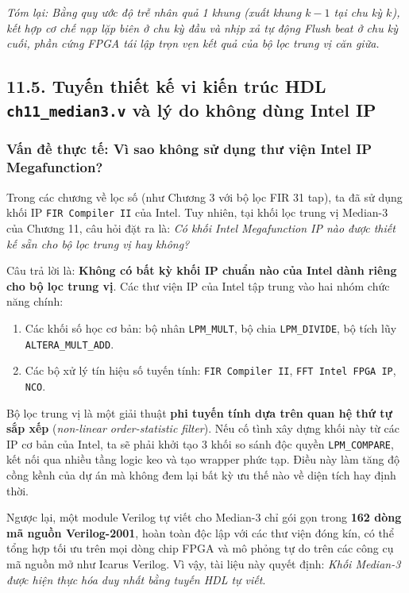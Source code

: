 \textit{Tóm lại: Bằng quy ước độ trễ nhân quả 1 khung (xuất khung $k-1$ tại chu kỳ $k$), kết hợp cơ chế nạp lặp biên ở chu kỳ đầu và nhịp xả tự động Flush beat ở chu kỳ cuối, phần cứng FPGA tái lập trọn vẹn kết quả của bộ lọc trung vị căn giữa.}

\subsection*{11.5. Tuyến thiết kế vi kiến trúc HDL \texttt{ch11\_median3.v} và lý do không dùng Intel IP}

\subsubsection*{Vấn đề thực tế: Vì sao không sử dụng thư viện Intel IP Megafunction?}
Trong các chương về lọc số (như Chương 3 với bộ lọc FIR 31 tap), ta đã sử dụng khối IP \texttt{FIR Compiler II} của Intel. Tuy nhiên, tại khối lọc trung vị Median-3 của Chương 11, câu hỏi đặt ra là: \emph{Có khối Intel Megafunction IP nào được thiết kế sẵn cho bộ lọc trung vị hay không?}

Câu trả lời là: \textbf{Không có bất kỳ khối IP chuẩn nào của Intel dành riêng cho bộ lọc trung vị}.
Các thư viện IP của Intel tập trung vào hai nhóm chức năng chính:
\begin{enumerate}
    \item Các khối số học cơ bản: bộ nhân \texttt{LPM\_MULT}, bộ chia \texttt{LPM\_DIVIDE}, bộ tích lũy \texttt{ALTERA\_MULT\_ADD}.
    \item Các bộ xử lý tín hiệu số tuyến tính: \texttt{FIR Compiler II}, \texttt{FFT Intel FPGA IP}, \texttt{NCO}.
\end{enumerate}
Bộ lọc trung vị là một giải thuật \textbf{phi tuyến tính dựa trên quan hệ thứ tự sắp xếp} (\emph{non-linear order-statistic filter}). Nếu cố tình xây dựng khối này từ các IP cơ bản của Intel, ta sẽ phải khởi tạo 3 khối so sánh độc quyền \texttt{LPM\_COMPARE}, kết nối qua nhiều tầng logic keo và tạo wrapper phức tạp. Điều này làm tăng độ cồng kềnh của dự án mà không đem lại bất kỳ ưu thế nào về diện tích hay định thời.

Ngược lại, một module Verilog tự viết cho Median-3 chỉ gói gọn trong \textbf{162 dòng mã nguồn Verilog-2001}, hoàn toàn độc lập với các thư viện đóng kín, có thể tổng hợp tối ưu trên mọi dòng chip FPGA và mô phỏng tự do trên các công cụ mã nguồn mở như Icarus Verilog. Vì vậy, tài liệu này quyết định: \emph{Khối Median-3 được hiện thực hóa duy nhất bằng tuyến HDL tự viết}.

